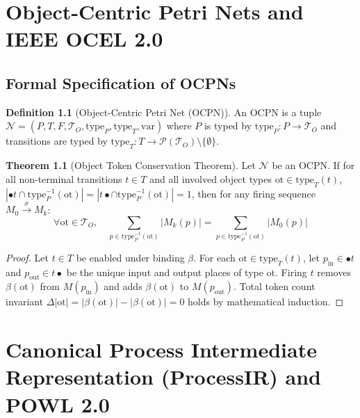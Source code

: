 \documentclass[11pt,a4paper,oneside]{book}
\theoremstyle{definition}
\newtheorem{definition}{Definition}[chapter]
\newtheorem{theorem}{Theorem}[chapter]
\begin{document}
\chapter{Object-Centric Petri Nets and IEEE OCEL 2.0}

\section{Formal Specification of OCPNs}

\begin{definition}[Object-Centric Petri Net (OCPN)]
An OCPN is a tuple $\mathcal{N} = (P, T, F, \mathcal{T}_O, \text{type}_P, \text{type}_T, \text{var})$ where $P$ is typed by $\text{type}_P : P \to \mathcal{T}_O$ and transitions are typed by $\text{type}_T : T \to \mathcal{P}(\mathcal{T}_O) \setminus \{\emptyset\}$.
\end{definition}

\begin{theorem}[Object Token Conservation Theorem]
Let $\mathcal{N}$ be an OCPN. If for all non-terminal transitions $t \in T$ and all involved object types $\text{ot} \in \text{type}_T(t)$, $|\bullet t \cap \text{type}_P^{-1}(\text{ot})| = |t \bullet \cap \text{type}_P^{-1}(\text{ot})| = 1$, then for any firing sequence $M_0 \xrightarrow{\sigma} M_k$:
$$\forall \text{ot} \in \mathcal{T}_O, \quad \sum_{p \in \text{type}_P^{-1}(\text{ot})} |M_k(p)| = \sum_{p \in \text{type}_P^{-1}(\text{ot})} |M_0(p)|$$
\end{theorem}

\begin{proof}
Let $t \in T$ be enabled under binding $\beta$. For each $\text{ot} \in \text{type}_T(t)$, let $p_{\text{in}} \in \bullet t$ and $p_{\text{out}} \in t \bullet$ be the unique input and output places of type $\text{ot}$. Firing $t$ removes $\beta(\text{ot})$ from $M(p_{\text{in}})$ and adds $\beta(\text{ot})$ to $M(p_{\text{out}})$. Total token count invariant $\Delta |\text{ot}| = |\beta(\text{ot})| - |\beta(\text{ot})| = 0$ holds by mathematical induction.
\end{proof}

\chapter{Canonical Process Intermediate Representation (ProcessIR) and POWL 2.0}
\end{document}
